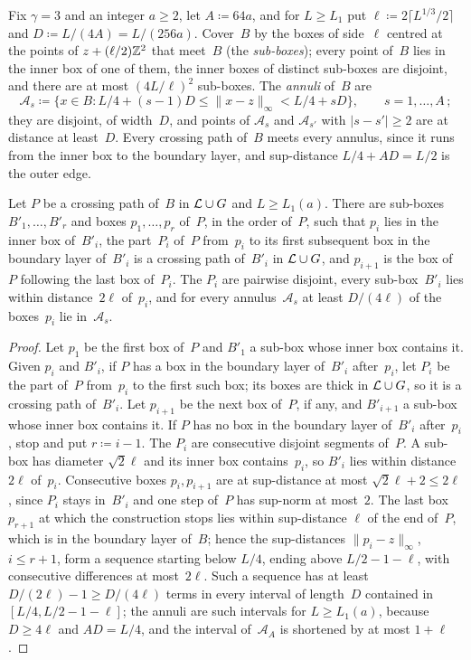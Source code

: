 \documentclass[11pt,letterpaper]{article}
\begin{document}
Fix $\gamma=3$ and an integer $a\ge2$, let $A\coloneqq64a$, and for $L\ge L_1$ put $\ell\coloneqq2\lceil L^{1/3}/2\rceil$ and $D\coloneqq L/(4A)=L/(256a)$. Cover~$B$ by the boxes of side~$\ell$ centred at the points of $z+(\ell/2)\mathbb Z^2$ that meet~$B$ (the \emph{sub-boxes}); every point of~$B$ lies in the inner box of one of them, the inner boxes of distinct sub-boxes are disjoint, and there are at most $(4L/\ell)^2$ sub-boxes. The \emph{annuli} of~$B$ are
\begin{equation*}
  \mathcal A_s\coloneqq\bigl\{x\in B\colon L/4+(s-1)D\le\lVert x-z\rVert_\infty<L/4+sD\bigr\},\qquad s=1,\dots,A\,;
\end{equation*}
they are disjoint, of width~$D$, and points of $\mathcal A_s$ and $\mathcal A_{s'}$ with $\lvert s-s'\rvert\ge2$ are at distance at least~$D$. Every crossing path of~$B$ meets every annulus, since it runs from the inner box to the boundary layer, and sup-distance $L/4+AD=L/2$ is the outer edge.

\begin{lemma}
\label{lem:chain}
Let $P$ be a crossing path of~$B$ in $\mathcal L\cup G$ and $L\ge L_1(a)$. There are sub-boxes $B'_1,\dots,B'_r$ and boxes $p_1,\dots,p_r$ of~$P$, in the order of~$P$, such that $p_i$ lies in the inner box of~$B'_i$, the part~$P_i$ of~$P$ from~$p_i$ to its first subsequent box in the boundary layer of~$B'_i$ is a crossing path of~$B'_i$ in $\mathcal L\cup G$, and $p_{i+1}$ is the box of~$P$ following the last box of~$P_i$. The $P_i$ are pairwise disjoint, every sub-box~$B'_i$ lies within distance~$2\ell$ of~$p_i$, and for every annulus~$\mathcal A_s$ at least $D/(4\ell)$ of the boxes~$p_i$ lie in~$\mathcal A_s$.
\end{lemma}

\begin{proof}
Let $p_1$ be the first box of~$P$ and $B'_1$ a sub-box whose inner box contains it. Given $p_i$ and $B'_i$, if $P$ has a box in the boundary layer of~$B'_i$ after~$p_i$, let $P_i$ be the part of~$P$ from~$p_i$ to the first such box; its boxes are thick in $\mathcal L\cup G$, so it is a crossing path of~$B'_i$. Let $p_{i+1}$ be the next box of~$P$, if any, and $B'_{i+1}$ a sub-box whose inner box contains it. If $P$ has no box in the boundary layer of~$B'_i$ after~$p_i$, stop and put $r\coloneqq i-1$. The $P_i$ are consecutive disjoint segments of~$P$. A sub-box has diameter $\sqrt2\ell$ and its inner box contains~$p_i$, so $B'_i$ lies within distance $2\ell$ of~$p_i$. Consecutive boxes $p_i,p_{i+1}$ are at sup-distance at most $\sqrt2\ell+2\le2\ell$, since $P_i$ stays in~$B'_i$ and one step of~$P$ has sup-norm at most~$2$. The last box $p_{r+1}$ at which the construction stops lies within sup-distance $\ell$ of the end of~$P$, which is in the boundary layer of~$B$; hence the sup-distances $\lVert p_i-z\rVert_\infty$, $i\le r+1$, form a sequence starting below $L/4$, ending above $L/2-1-\ell$, with consecutive differences at most~$2\ell$. Such a sequence has at least $D/(2\ell)-1\ge D/(4\ell)$ terms in every interval of length~$D$ contained in $[L/4,L/2-1-\ell]$; the annuli are such intervals for $L\ge L_1(a)$, because $D\ge4\ell$ and $AD=L/4$, and the interval of~$\mathcal A_A$ is shortened by at most $1+\ell$.
\end{proof}
\end{document}
